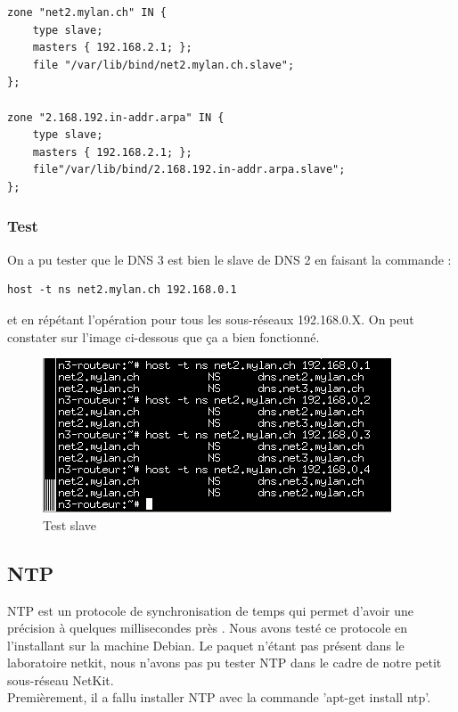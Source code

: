 \documentclass{article}
\begin{document}
\begin{lstlisting}
zone "net2.mylan.ch" IN {
	type slave;
	masters { 192.168.2.1; };
	file "/var/lib/bind/net2.mylan.ch.slave";
};

zone "2.168.192.in-addr.arpa" IN {
	type slave;
	masters { 192.168.2.1; };
	file"/var/lib/bind/2.168.192.in-addr.arpa.slave";
};
\end{lstlisting}

\subsubsection{Test}

On a pu tester que le DNS 3 est bien le slave de DNS 2 en faisant la commande : 

\begin{lstlisting}
host -t ns net2.mylan.ch 192.168.0.1
\end{lstlisting}

et en répétant l'opération pour tous les sous-réseaux 192.168.0.X. On peut constater sur l'image ci-dessous que ça a bien fonctionné.

\begin{figure}[h]
	\centering
	\includegraphics{./captures/part1part3.png}
	\caption{Test slave}
	\label{fig:Test slave}
\end{figure}


\subsection{NTP}
NTP est un protocole de synchronisation de temps qui permet d'avoir une précision à quelques millisecondes près \cite{NTP}. Nous avons testé ce protocole en l'installant sur la machine Debian. Le paquet n'étant pas présent dans le laboratoire netkit, nous n'avons pas pu tester NTP dans le cadre de notre petit sous-réseau NetKit.\\

Premièrement, il a fallu installer NTP avec la commande 'apt-get install ntp'.\\
\end{document}
